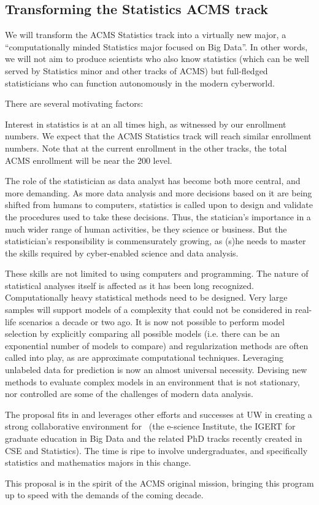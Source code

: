 \subsection{Transforming the Statistics  ACMS track}
We will transform the ACMS Statistics track into a virtually new
major, a ``computationally minded Statistics major focused on Big Data''. 
In other words, we will not aim to produce scientists who also know statistics (which
can be well served by Statistics minor and other tracks of ACMS) but
full-fledged statisticians who can function autonomously in the modern
cyberworld.

There are several motivating factors:
\bit
\item Interest in statistics is at an all times high, as witnessed by
  our enrollment numbers. We expect that the ACMS Statistics track
  will reach similar enrollment numbers. Note that at the current
  enrollment in the other tracks, the total ACMS enrollment will be
  near the 200 level.

\item The role of
  the statistician as data analyst has become both more central, and
  more demanding. As more data analysis and more decisions based on it
  are being shifted from humans to computers, statistics is called
  upon to design and validate the procedures used to take these
  decisions. Thus, the statician's importance in a much wider range of
  human activities, be they science or business. But the
  statistician's responsibility is commensurately growing, as (s)he needs
  to master the skills required by cyber-enabled science and data
  analysis.
\item These skills are not limited to using computers and
  programming. The nature of statistical analyses itself is
  affected \cite{friedman:97} as it has been long
  recognized. Computationally heavy statistical methods need to be
  designed. Very large samples will support models of a complexity
  that could not be considered in real-life scenarios a decade or two
  ago. It is now not possible to perform model selection by explicitly
  comparing all possible models (i.e. there can be an exponential
  number of models to compare) and regularization methods are often
  called into play, as are approximate computational
  techniques. Leveraging unlabeled data for prediction is now an
  almost universal necessity. Devising new methods to evaluate complex
  models in an environment that is not stationary, nor controlled are
  some of the challenges of modern data analysis.
\item The proposal fits in and leverages other  efforts and successes at UW in creating a strong collaborative environment for \cdse\ (the e-science Institute, the IGERT for graduate education in Big Data and the related PhD tracks recently created in CSE and Statistics). The time is ripe to involve undergraduates, and specifically statistics and mathematics majors in this change.
\item This proposal is in the spirit of the ACMS original mission,
  bringing this program up to speed with the demands of the coming decade.
\eit

